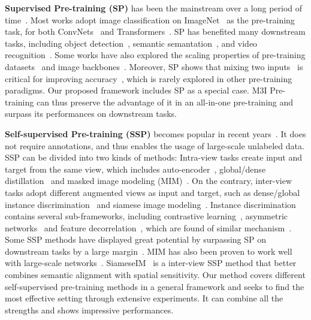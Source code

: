 \documentclass[10pt,twocolumn,letterpaper]{article}
\def\name{M3I Pre-training}
\begin{document}
\noindent\textbf{Supervised Pre-training (SP)} has been the mainstream over a long period of time~\cite{girshick2014rich,he2016deep,chen2017deeplab,dosovitskiy2020image,carion2020end,liu2021swin,liu2022convnet}. Most works adopt image classification on ImageNet~\cite{deng2009imagenet} as the pre-training task, for both ConvNets~\cite{he2016deep,xie2017aggregated,tan2019efficientnet,liu2022convnet} and Transformers~\cite{dosovitskiy2020image,touvron2021training,liu2021swin}. SP has benefited many downstream tasks, including object detection~\cite{girshick2014rich,carion2020end}, semantic semantation~\cite{chen2017deeplab,xiao2018unified}, and video recognition~\cite{bertasius2021space}. Some works have also explored the scaling properties of pre-training datasets~\cite{dosovitskiy2020image,zhai2022scaling} and image backbones~\cite{zhai2022scaling, abnar2021exploring}. Moreover, SP shows that mixing two inputs~\cite{zhang2017mixup,yun2019cutmix} is critical for improving accuracy~\cite{touvron2021training,Touvron2022DeiTIR}, which is rarely explored in other pre-training paradigms. Our proposed framework includes SP as a special case. \name{} can thus preserve the advantage of it in an all-in-one pre-training and surpass its performances on downstream tasks.

\vspace{0.5em}\noindent\textbf{Self-supervised Pre-training (SSP)} becomes popular in recent years~\cite{jaiswal2020survey,zhang2022survey}. It does not require annotations, and thus enables the usage of large-scale unlabeled data. SSP can be divided into two kinds of methods: Intra-view tasks create input and target from the same view, which includes auto-encoder~\cite{hinton2006reducing,vincent2008extracting}, global/dense distillation~\cite{hinton2015distilling,wei2022contrastive} and masked image modeling (MIM)~\cite{bao2021beit,he2022masked,baevski2022data2vec,chen2022context,xie2022simmim}. On the contrary, inter-view tasks adopt different augmented views as input and target, such as dense/global instance discrimination~\cite{wu2018unsupervised, oord2018representation} and siamese image modeling~\cite{anonymous2022siamese}. 
Instance discrimination contains several sub-frameworks, including contrastive learning~\cite{he2020momentum, chen2020simple}, asymmetric networks~\cite{grill2020bootstrap,chen2021exploring} and feature decorrelation~\cite{zbontar2021barlow,bardes2021vicreg}, which are found of similar mechanism~\cite{tian2021understanding,tao2022exploring}.
Some SSP methods have displayed great potential by surpassing SP on downstream tasks by a large margin~\cite{he2020momentum,chen2020simple,he2022masked}. MIM has also been proven to work well with large-scale networks~\cite{he2022masked}. SiameseIM~\cite{anonymous2022siamese} is a inter-view SSP method that better combines semantic alignment with spatial sensitivity. Our method covers different self-supervised pre-training methods in a general framework and seeks to find the most effective setting through extensive experiments. It can combine all the strengths and shows impressive performances.
\end{document}
